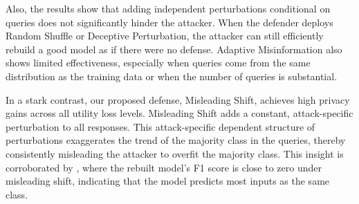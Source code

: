     Also, the results show that adding independent perturbations conditional on queries does not significantly hinder the attacker. When the defender deploys Random Shuffle or Deceptive Perturbation, the attacker can still efficiently rebuild a good model as if there were no defense. Adaptive Misinformation also shows limited effectiveness, especially when queries come from the same distribution as the training data or when the number of queries is substantial.

    In a stark contrast, our proposed defense, Misleading Shift, achieves high privacy gains across all utility loss levels. Misleading Shift adds a constant, attack-specific perturbation to all responses. This attack-specific dependent structure of perturbations exaggerates the trend of the majority class in the queries, thereby consistently misleading the attacker to overfit the majority class. This insight is corroborated by , where the rebuilt model's F1 score is close to zero under misleading shift, indicating that the model predicts most inputs as the same class. 
    
